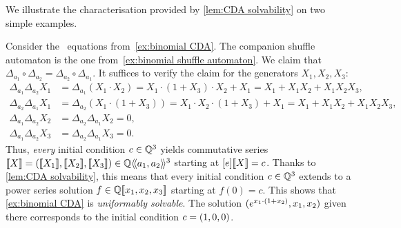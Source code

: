 We illustrate the characterisation provided by \cref{lem:CDA solvability}
on two simple examples.
%
\begin{example}
    Consider the \CDA~equations from~\cref{ex:binomial CDA}.
    The companion shuffle automaton is the one from~\cref{ex:binomial shuffle automaton}.
    We claim that $\Delta_{a_1} \circ \Delta_{a_2} = \Delta_{a_2} \circ \Delta_{a_1}$.
    It suffices to verify the claim for the generators $X_1, X_2, X_3$:
    \begin{align*}
        \Delta_{a_1} \Delta_{a_2} X_1
            &= \Delta_{a_1} (X_1 \cdot X_2)
            = X_1 \cdot (1 + X_3) \cdot X_2 + X_1
            = X_1 + X_1 X_2 + X_1 X_2 X_3, \\
        \Delta_{a_2} \Delta_{a_1} X_1
            &= \Delta_{a_2} (X_1 \cdot (1 + X_3))
            = X_1 \cdot X_2 \cdot (1 + X_3) + X_1
            = X_1 + X_1 X_2 + X_1 X_2 X_3, \\
        \Delta_{a_1} \Delta_{a_2} X_2
            &= \Delta_{a_2} \Delta_{a_1} X_2 = 0, \\
        \Delta_{a_1} \Delta_{a_2} X_3
            &= \Delta_{a_2} \Delta_{a_1} X_3 = 0.
    \end{align*}
    Thus, \emph{every} initial condition $c \in \mathbb Q^3$
    yields commutative series $\llbracket X\rrbracket = (\llbracket X_1\rrbracket, \llbracket X_2\rrbracket, \llbracket X_3\rrbracket) \in \mathbb Q\langle\!\langle a_1, a_2\rangle\!\rangle^3$
    starting at $[e]\llbracket X\rrbracket = c$.
    Thanks to \cref{lem:CDA solvability},
    this means that every initial condition $c \in \mathbb Q^3$
    extends to a power series solution $f \in \mathbb Q[\![x_1, x_2, x_3]\!]$ starting at $f(0) = c$.
    This shows that \cref{ex:binomial CDA} is \emph{uniformably solvable}.
    The solution $(e^{x_1 \cdot (1 + x_2)}, x_1, x_2)$ given there
    corresponds to the initial condition $c = (1, 0, 0)$.
\end{example}

